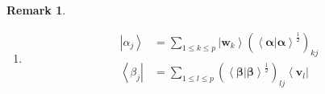 \documentclass[aps,preprint]{revtex4}%
\newtheorem{remark}[theorem]{Remark}
\begin{document}
\begin{remark}
\begin{enumerate}
\begin{enumerate}
\item
\begin{align}
\left\vert \boldsymbol{v}\right\rangle \left\langle \boldsymbol{v}\right\vert
\left\vert \boldsymbol{w}\right\rangle \left\langle \boldsymbol{w}\right\vert
&  =P_{v}P_{w}\\
\left\langle \boldsymbol{v}\right\vert \left\vert \boldsymbol{w}\right\rangle
\left\langle \boldsymbol{w}\right\vert \left\vert \boldsymbol{v}\right\rangle
&  =\left\langle \boldsymbol{v}\right\vert \left\vert \boldsymbol{w}%
\right\rangle \left\langle \boldsymbol{w}\right\vert \left\vert \boldsymbol{v}%
\right\rangle ^{\dagger}=\mathbb{P}_{v}\\
\left\langle \boldsymbol{w}\right\vert \left\vert \boldsymbol{v}\right\rangle
\left\langle \boldsymbol{v}\right\vert \left\vert \boldsymbol{w}\right\rangle
&  =\left\langle \boldsymbol{w}\right\vert \left\vert \boldsymbol{v}%
\right\rangle ^{\dagger}\left\langle \boldsymbol{v}\right\vert \left\vert
\boldsymbol{w}\right\rangle =\mathbb{P}_{w}%
\end{align}

\end{enumerate}

\item
\begin{align}
\left\vert \overset{}{\alpha_{j}}\right\rangle  &  =\sum_{1\leq k\leq
p}\left\vert \overset{}{\boldsymbol{w}_{k}}\right\rangle \left(  \left\langle
\left.  \boldsymbol{\alpha}\right\vert \boldsymbol{\alpha}\right\rangle
^{\frac{1}{2}}\right)  _{kj}\\
\left\langle \overset{}{\beta}_{j}\right\vert  &  =\sum_{1\leq l\leq p}\left(
\left\langle \left.  \boldsymbol{\beta}\right\vert \boldsymbol{\beta
}\right\rangle ^{\frac{1}{2}}\right)  _{lj}\left\langle
\overset{}{\boldsymbol{v}_{l}}\right\vert
\end{align}

\end{enumerate}
\end{remark}
\end{document}
